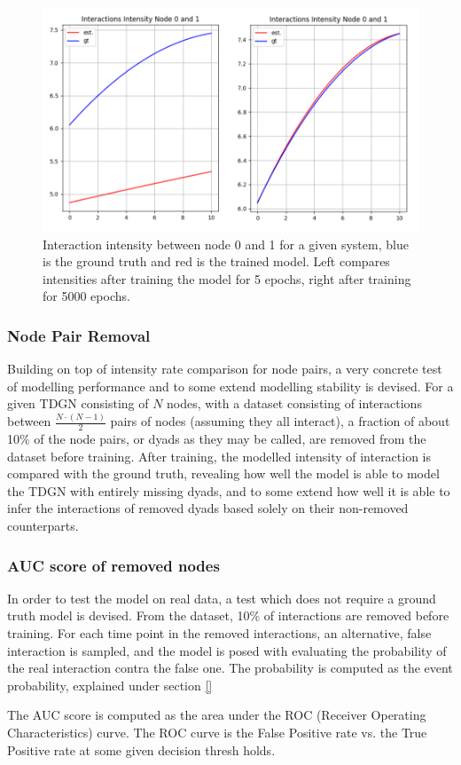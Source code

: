 \begin{figure}[H]
    \centering
    \includegraphics[width=\textwidth]{0_images/5vs5000epochs.png}
    \caption{Interaction intensity between node 0 and 1 for a given system, blue is the ground truth and red is the trained model. Left compares intensities after training the model for 5 epochs, right after training for 5000 epochs.}
    \label{fig:5vs5000epochs}
\end{figure}


\subsubsection{Node Pair Removal}
\label{sec:Method:Evaluation:NodePairRemoval}
Building on top of intensity rate comparison for node pairs, a very concrete test of modelling performance and to some extend modelling stability is devised.
For a given TDGN consisting of $N$ nodes, with a dataset consisting of interactions between $\frac{N\cdot(N-1)}{2}$ pairs of nodes (assuming they all interact), a fraction of about 10\% of the node pairs, or dyads as they may be called, are removed from the dataset before training.
After training, the modelled intensity of interaction is compared with the ground truth, revealing how well the model is able to model the TDGN with entirely missing dyads, and to some extend how well it is able to infer the interactions of removed dyads based solely on their non-removed counterparts.


\subsubsection{AUC score of removed nodes}
\label{sec:Method:Evaluation:AUC}
In order to test the model on real data, a test which does not require a ground truth model is devised.
From the dataset, 10\% of interactions are removed before training.
For each time point in the removed interactions, an alternative, false interaction is sampled, and the model is posed with evaluating the probability of the real interaction contra the false one.
The probability is computed as the event probability, explained under section \ref{}

The AUC score is computed as the area under the ROC (Receiver Operating Characteristics) curve.
The ROC curve is the False Positive rate vs. the True Positive rate at some given decision thresh holds.



